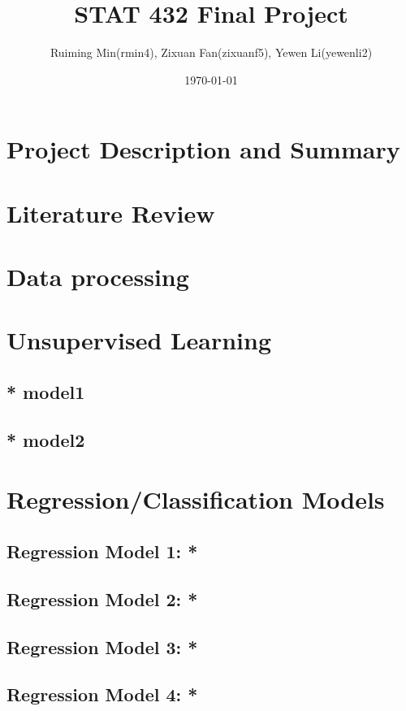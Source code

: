 \documentclass{report}
\title{STAT 432 Final Project}
\author{Ruiming Min(rmin4), Zixuan Fan(zixuanf5), Yewen Li(yewenli2)}
\date{\today}
\begin{document}
\maketitle

\section*{Project Description and Summary}

\section*{Literature Review}

\section*{Data processing}


\section*{Unsupervised Learning}

\subsection*{* model1}


\subsection*{* model2}


\section*{Regression/Classification Models}

\subsection*{Regression Model 1: *}

\subsection*{Regression Model 2: *}

\subsection*{Regression Model 3: *}

\subsection*{Regression Model 4: *}
\end{document}
